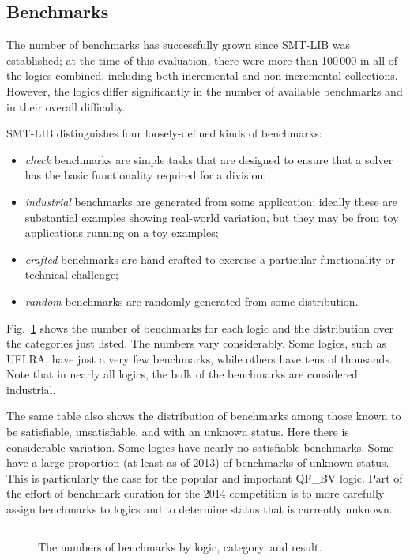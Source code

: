 \documentclass[smallcondensed]{svjour3}
\begin{document}
\subsection{Benchmarks}
\label{Benchmarks}

The number of benchmarks has successfully grown since SMT-LIB was established; at the time of this evaluation, there were more than 100\,000 in all of the logics combined, including both incremental and non-incremental collections. However, the logics differ significantly in the number of available benchmarks and in their overall difficulty.

SMT-LIB distinguishes four loosely-defined kinds of benchmarks:
\begin{itemize}[noitemsep,nolistsep]
\item {\em check} benchmarks are simple tasks that are designed to ensure that a solver has the basic functionality required for a division;
\item {\em industrial} benchmarks are generated from some application; ideally these are substantial examples showing real-world variation, but they may be from toy applications running on a toy examples;
\item {\em crafted} benchmarks are hand-crafted to exercise a particular functionality or technical challenge;
\item {\em random} benchmarks are randomly generated from some distribution.
\end{itemize}
Fig.~\ref{Fig:category} shows the number of benchmarks for each logic and the distribution over the categories just listed. The numbers vary considerably. Some logics, such as UFLRA, have just a very few benchmarks, while others have tens of thousands. Note that in nearly all logics, the bulk of the benchmarks are 
considered industrial.

The same table also shows the distribution of benchmarks among those known to be satisfiable, unsatisfiable, and with an unknown status. Here there is 
considerable variation. Some logics have nearly no satisfiable benchmarks. Some have a large proportion (at least as of 2013) of benchmarks of unknown status.
This is particularly the case for the popular and important QF\_BV logic.
Part of the effort of benchmark curation for the 2014 competition is to more carefully assign benchmarks to logics and to determine status that is currently unknown.

\begin{figure}
\centering
\begin{tabular}{|l|r|r@{\hskip 8pt}r@{\hskip 8pt}r@{\hskip 8pt}r|r@{\hskip 8pt}r@{\hskip 8pt}r|}
\hline

\end{tabular}
\caption{The numbers of benchmarks by logic, category, and result.}
\label{Fig:category}
\end{figure}
\end{document}
